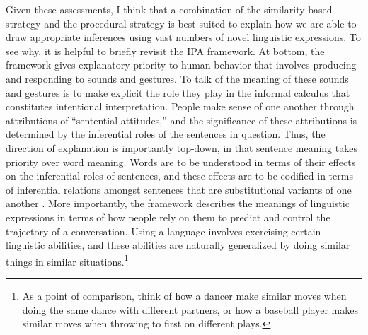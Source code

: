 Given these assessments, I think that a combination of the similarity-based strategy and the procedural strategy is best suited to explain how we are able to draw appropriate inferences using vast numbers of novel linguistic expressions. To see why, it is helpful to briefly revisit the IPA framework. At bottom, the framework gives explanatory priority to human behavior that involves producing and responding to sounds and gestures. To talk of the meaning of these sounds and gestures is to make explicit the role they play in the informal calculus that constitutes intentional interpretation. People make sense of one another through attributions of ``sentential attitudes,'' and the significance of these attributions is determined by the inferential roles of the sentences in question. Thus, the direction of explanation is importantly top-down, in that sentence meaning takes priority over word meaning. Words are to be understood in terms of their effects on the inferential roles of sentences, and these effects are to be codified in terms of inferential relations amongst sentences that are substitutional variants of one another \citep{Brandom:1994}. More importantly, the framework describes the meanings of linguistic expressions in terms of how people rely on them to predict and control the trajectory of a conversation. Using a language involves exercising certain linguistic abilities, and these abilities are naturally generalized by doing similar things in similar situations.\footnote{As a point of comparison, think of how a dancer make similar moves when doing the same dance with different partners, or how a baseball player makes similar moves when throwing to first on different plays.}

